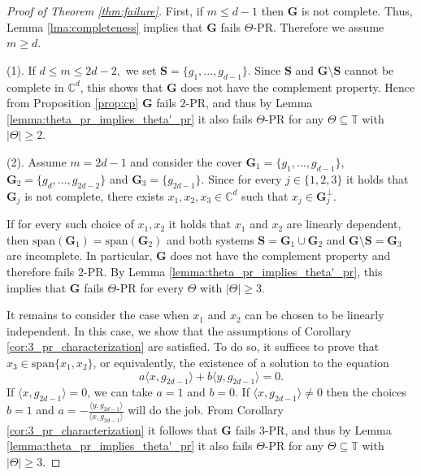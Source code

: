 \documentclass[reqno,a4paper,11pt]{amsart}
\numberwithin{equation}{section}
\def\T{{\mathbb T}}
\def\C{{\mathbb C}}
\newcommand{\lspan}{{\mathrm{span}}}
\newcommand\1{\mathds{1}}
\begin{document}
\begin{proof}[Proof of Theorem \ref{thm:failure}]
    First, if $m\leq d-1$ then $\mathbf{G}$ is not complete. Thus, Lemma \ref{lma:completeness} implies that $\mathbf{G}$ fails $\Theta$-PR. Therefore we assume $m \geq d$.
    
    (1). If $d\leq m\leq 2d-2,$ we set $\mathbf{S} = \{g_1,...,g_{d-1}\}$. Since $\mathbf{S}$ and $\mathbf{G} \setminus \mathbf{S}$ cannot be complete in $\C^d$, this shows that $\mathbf{G}$ does not have the complement property. Hence from Proposition \ref{prop:cp} $\mathbf{G}$ fails $2$-PR, and thus by Lemma \ref{lemma:theta_pr_implies_theta'_pr} it also fails $\Theta$-PR for any $\Theta \subseteq \T$ with $|\Theta|\geq 2$.

    (2). Assume $m=2d-1$ and consider the cover $\mathbf{G}_1 = \{g_1,...,g_{d-1}\}$, $\mathbf{G}_2=\{g_d,...,g_{2d-2}\}$ and $\mathbf{G}_3 = \{g_{2d-1}\}$. Since for every $j \in \{ 1,2,3 \}$ it holds that $\mathbf{G}_j$ is not complete, there exists $x_1,x_2,x_3\in \C^d$ such that $x_j\in \mathbf{G}_j^\perp$.
    
    If for every such choice of $x_1,x_2$ it holds that $x_1$ and $x_2$ are linearly dependent, then $\lspan(\mathbf{G}_1) = \lspan(\mathbf{G}_2)$ and both systems $\mathbf{S} = \mathbf{G}_1 \cup \mathbf{G}_2$ and $\mathbf{G} \setminus \mathbf{S} = \mathbf{G}_3$ are incomplete. In particular, $\mathbf{G}$ does not have the complement property and therefore fails $2$-PR. By Lemma \ref{lemma:theta_pr_implies_theta'_pr}, this implies that $\mathbf{G}$ fails $\Theta$-PR for every $\Theta$ with $|\Theta| \geq 3$.

    It remains to consider the case when $x_1$ and $x_2$ can be chosen to be linearly independent. In this case, we show that the assumptions of Corollary \ref{cor:3_pr_characterization} are satisfied. To do so, it suffices to prove that $x_3\in \lspan\{x_1,x_2\}$, or equivalently, the existence of a solution to the equation
    $$a\langle x,g_{2d-1}\rangle + b\langle y,g_{2d-1}\rangle=0.$$
    If $\langle x,g_{2d-1}\rangle =0$, we can take $a=1$ and $b=0$. If $\langle x,g_{2d-1}\rangle \neq 0$ then the choices $b=1$ and $a=-\frac{\langle y,g_{2d-1}\rangle}{\langle x,g_{2d-1}\rangle}$ will do the job. From Corollary \ref{cor:3_pr_characterization} it follows that $\mathbf{G}$ fails $3$-PR, and thus by Lemma \ref{lemma:theta_pr_implies_theta'_pr} it also fails $\Theta$-PR for any $\Theta\subseteq \T$ with $|\Theta|\geq 3$.
    \end{proof}
\end{document}
